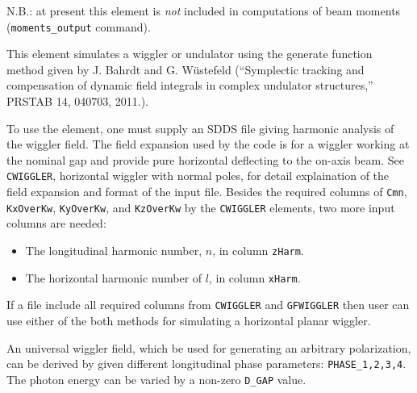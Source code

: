 N.B.: at present this element is {\em not} included in computations
of beam moments (\verb|moments_output| command).

This element simulates a wiggler or undulator using the generate
function method given by J. Bahrdt and G. W\"{u}stefeld (``Symplectic
tracking and compensation of dynamic field integrals in complex
undulator structures,'' PRSTAB 14, 040703, 2011.). 

To use the element, one must supply an SDDS file giving harmonic
analysis of the wiggler field. The field expansion used by the code is
for a wiggler working at the nominal gap and provide pure horizontal
deflecting to the on-axis beam. See \verb|CWIGGLER|, horizontal
wiggler with normal poles, for detail explaination of the field
expansion and format of the input file. Besides the required columns
of {\tt Cmn}, {\tt KxOverKw}, {\tt KyOverKw}, and {\tt KzOverKw} by
the \verb|CWIGGLER| elements, two more input columns are needed:
\begin{itemize}
\item The longitudinal harmonic number, $n$, in column {\tt zHarm}.
\item The horizontal harmonic number of $l$, in column {\tt xHarm}.
\end{itemize}
If a file include all required columns from \verb|CWIGGLER| and
\verb|GFWIGGLER| then user can use either of the both methods for
simulating a horizontal planar wiggler.

An universal wiggler field, which be used for generating an arbitrary
polarization, can be derived by given different longitudinal phase
parameters: {\tt PHASE\_1,2,3,4}. The photon energy can be varied by a
non-zero {\tt D\_GAP} value.
